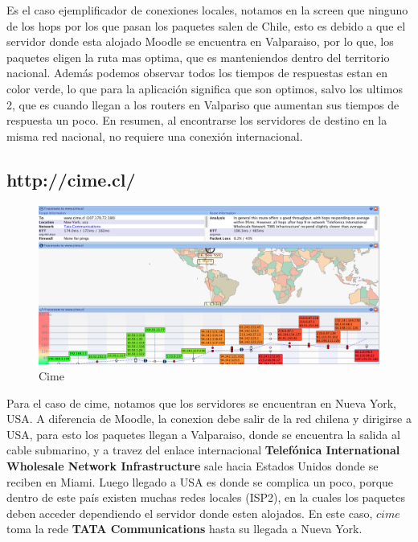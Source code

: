 \documentclass[a4papaer]{article}
\begin{document}
Es el caso ejemplificador de conexiones locales, notamos en la screen que ninguno de los hops por los que pasan los paquetes salen de Chile, esto es debido a que el servidor donde esta alojado Moodle se encuentra en Valparaiso, por lo que, los paquetes eligen la ruta mas optima, que es manteniendos dentro del territorio nacional. Además podemos observar todos los tiempos de respuestas estan en color verde, lo que para la aplicación significa que son optimos, salvo los ultimos 2, que es cuando llegan a los routers en Valpariso que aumentan sus tiempos de respuesta un poco. En resumen, al encontrarse los servidores de destino en la misma red nacional, no requiere una conexión internacional.

\pagebreak

\subsection{http://cime.cl/}


\begin{figure}[h]
  \centering
    \includegraphics[width=1\textwidth]{ss2}
  \caption{Cime}
  \label{fig:Trace Route de http://cime.cl/}
\end{figure}



Para el caso de cime, notamos que los servidores se encuentran en Nueva York, USA. A diferencia de Moodle, la conexion debe salir de la red chilena y dirigirse a USA, para esto los paquetes llegan a Valparaiso, donde se encuentra la salida al cable submarino, y a travez del enlace internacional  \textbf{Telefónica International Wholesale Network Infrastructure} sale hacia Estados Unidos donde se reciben en Miami. Luego llegado a USA es donde se complica un poco, porque dentro de este país existen muchas redes locales (ISP2), en la cuales los paquetes deben acceder dependiendo el servidor donde esten alojados. En este caso, $cime$ toma la rede \textbf{TATA Communications} hasta su llegada a Nueva York.
 
\end{document}
